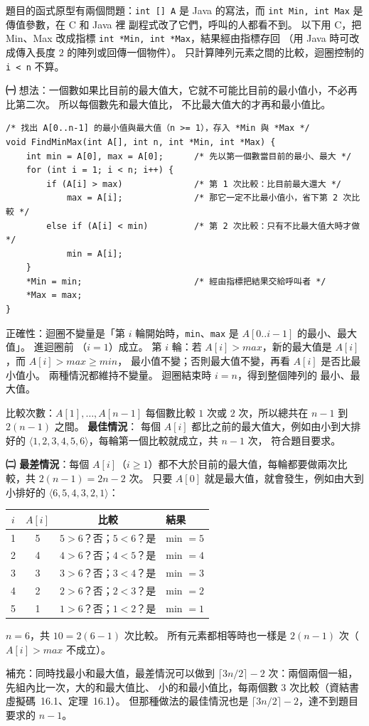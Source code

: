\begin{pastsoln}
題目的函式原型有兩個問題：\texttt{int [] A} 是 Java 的寫法，而 \texttt{int Min, int Max} 是傳值參數，在 C 和 Java 裡
副程式改了它們，呼叫的人都看不到。 以下用 C，把 Min、Max 改成指標 \texttt{int *Min, int *Max}，結果經由指標存回
（用 Java 時可改成傳入長度 $2$ 的陣列或回傳一個物件）。 只計算陣列元素之間的比較，迴圈控制的 \texttt{i < n} 不算。

\textbf{㈠} 想法：一個數如果比目前的最大值大，它就不可能比目前的最小值小，不必再比第二次。 所以每個數先和最大值比，
不比最大值大的才再和最小值比。
\begin{verbatim}
/* 找出 A[0..n-1] 的最小值與最大值（n >= 1），存入 *Min 與 *Max */
void FindMinMax(int A[], int n, int *Min, int *Max) {
    int min = A[0], max = A[0];      /* 先以第一個數當目前的最小、最大 */
    for (int i = 1; i < n; i++) {
        if (A[i] > max)              /* 第 1 次比較：比目前最大還大 */
            max = A[i];              /* 那它一定不比最小值小，省下第 2 次比較 */
        else if (A[i] < min)         /* 第 2 次比較：只有不比最大值大時才做 */
            min = A[i];
    }
    *Min = min;                      /* 經由指標把結果交給呼叫者 */
    *Max = max;
}
\end{verbatim}
正確性：迴圈不變量是「第 $i$ 輪開始時，\texttt{min}、\texttt{max} 是 $A[0..i-1]$ 的最小、最大值」。 進迴圈前
（$i = 1$）成立。 第 $i$ 輪：若 $A[i] > \mathit{max}$，新的最大值是 $A[i]$，而 $A[i] > \mathit{max} \ge \mathit{min}$，
最小值不變；否則最大值不變，再看 $A[i]$ 是否比最小值小。 兩種情況都維持不變量。 迴圈結束時 $i = n$，得到整個陣列的
最小、最大值。

比較次數：$A[1], \ldots, A[n-1]$ 每個數比較 $1$ 次或 $2$ 次，所以總共在 $n - 1$ 到 $2(n - 1)$ 之間。 \textbf{最佳情況}：
每個 $A[i]$ 都比之前的最大值大，例如由小到大排好的 $\langle 1, 2, 3, 4, 5, 6\rangle$，每輪第一個比較就成立，共 $n - 1$ 次，
符合題目要求。

\textbf{㈡ 最差情況}：每個 $A[i]$（$i \ge 1$）都不大於目前的最大值，每輪都要做兩次比較，共 $2(n - 1) = 2n - 2$ 次。
只要 $A[0]$ 就是最大值，就會發生，例如由大到小排好的 $\langle 6, 5, 4, 3, 2, 1\rangle$：
\begin{center}
\small
\begin{tabular}{cccl}
\toprule
$i$ & $A[i]$ & 比較 & 結果 \\
\midrule
1 & 5 & $5 > 6$？否；$5 < 6$？是 & min $= 5$ \\
2 & 4 & $4 > 6$？否；$4 < 5$？是 & min $= 4$ \\
3 & 3 & $3 > 6$？否；$3 < 4$？是 & min $= 3$ \\
4 & 2 & $2 > 6$？否；$2 < 3$？是 & min $= 2$ \\
5 & 1 & $1 > 6$？否；$1 < 2$？是 & min $= 1$ \\
\bottomrule
\end{tabular}
\end{center}
$n = 6$，共 $10 = 2(6 - 1)$ 次比較。 所有元素都相等時也一樣是 $2(n-1)$ 次（$A[i] > \mathit{max}$ 不成立）。

補充：同時找最小和最大值，最差情況可以做到 $\lceil 3n/2 \rceil - 2$ 次：兩個兩個一組，先組內比一次，大的和最大值比、
小的和最小值比，每兩個數 $3$ 次比較（資結書虛擬碼~16.1、定理~16.1）。 但那種做法的最佳情況也是
$\lceil 3n/2 \rceil - 2$，達不到題目要求的 $n - 1$。
\end{pastsoln}
